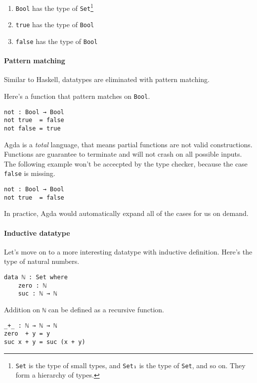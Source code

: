 \documentclass[12pt, a4paper]{article}
\begin{document}
\begin{enumerate}
    \item {\lstinline|Bool|} has the type of {\lstinline|Set|}\footnote{{\lstinline|Set|} is the type of small types, and {\lstinline|Set₁|} is the type
of {\lstinline|Set|}, and so on. They form a hierarchy of types.}
    \item {\lstinline|true|} has the type of {\lstinline|Bool|}
    \item {\lstinline|false|} has the type of {\lstinline|Bool|}
\end{enumerate}

\paragraph{Pattern matching}
Similar to Haskell, datatypes are eliminated with pattern matching.

Here's a function that pattern matches on {\lstinline|Bool|}.

\begin{lstlisting}
not : Bool → Bool
not true  = false
not false = true
\end{lstlisting}

Agda is a \textit{total} language, that means partial functions are not valid constructions.
Functions are guarantee to terminate and will not crash on all possible inputs.
The following example won't be accecpted by the type checker, because the case
{\lstinline|false|} is missing.

\begin{lstlisting}
not : Bool → Bool
not true  = false
\end{lstlisting}

In practice, Agda would automatically expand all of the cases for us on demand.

\paragraph{Inductive datatype} Let's move on to a more interesting datatype with
inductive definition. Here's the type of natural numbers.
\begin{lstlisting}
data ℕ : Set where
    zero : ℕ
    suc : ℕ → ℕ
\end{lstlisting}

Addition on {\lstinline|ℕ|} can be defined as a recursive function.

\begin{lstlisting}
_+_ : ℕ → ℕ → ℕ
zero  + y = y
suc x + y = suc (x + y)
\end{lstlisting}
\end{document}
